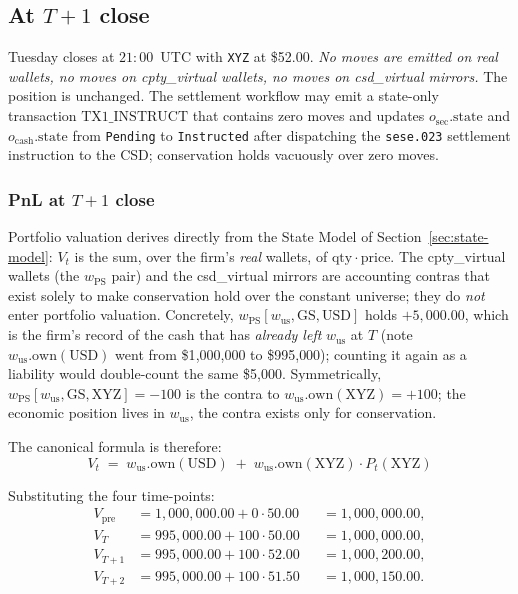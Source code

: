 \documentclass[11pt,a4paper]{article}
\begin{document}
\subsection{At $T+1$ close}
\label{sec:buy-T1}

Tuesday closes at $21{:}00$~UTC with \texttt{XYZ} at \$52.00. \emph{No moves are emitted on real wallets, no moves on cpty\_virtual wallets, no moves on csd\_virtual mirrors.} The position is unchanged. The settlement workflow may emit a state-only transaction $\mathrm{TX1\_INSTRUCT}$ that contains zero moves and updates $o_{\mathrm{sec}}.\mathrm{state}$ and $o_{\mathrm{cash}}.\mathrm{state}$ from \texttt{Pending} to \texttt{Instructed} after dispatching the \texttt{sese.023} settlement instruction to the CSD; conservation holds vacuously over zero moves.

\subsubsection*{PnL at $T+1$ close}

Portfolio valuation derives directly from the State Model of Section~\ref{sec:state-model}: $V_t$ is the sum, over the firm's \emph{real} wallets, of $\mathrm{qty} \cdot \mathrm{price}$. The cpty\_virtual wallets (the $w_{\mathrm{PS}}$ pair) and the csd\_virtual mirrors are accounting contras that exist solely to make conservation hold over the constant universe; they do \emph{not} enter portfolio valuation. Concretely, $w_{\mathrm{PS}}[w_{\mathrm{us}}, \mathrm{GS}, \mathrm{USD}]$ holds $+5{,}000.00$, which is the firm's record of the cash that has \emph{already left} $w_{\mathrm{us}}$ at $T$ (note $w_{\mathrm{us}}.\mathrm{own}(\mathrm{USD})$ went from \$1{,}000{,}000 to \$995{,}000); counting it again as a liability would double-count the same \$5{,}000. Symmetrically, $w_{\mathrm{PS}}[w_{\mathrm{us}}, \mathrm{GS}, \mathrm{XYZ}] = -100$ is the contra to $w_{\mathrm{us}}.\mathrm{own}(\mathrm{XYZ}) = +100$; the economic position lives in $w_{\mathrm{us}}$, the contra exists only for conservation.

The canonical formula is therefore:
\[
\boxed{\;V_t \;=\; w_{\mathrm{us}}.\mathrm{own}(\mathrm{USD}) \;+\; w_{\mathrm{us}}.\mathrm{own}(\mathrm{XYZ}) \cdot P_t(\mathrm{XYZ})\;}
\]

Substituting the four time-points:
\begin{align*}
V_{\mathrm{pre}} &= 1{,}000{,}000.00 + 0 \cdot 50.00            &&= 1{,}000{,}000.00, \\
V_T              &= 995{,}000.00   + 100 \cdot 50.00            &&= 1{,}000{,}000.00, \\
V_{T+1}          &= 995{,}000.00   + 100 \cdot 52.00            &&= 1{,}000{,}200.00, \\
V_{T+2}          &= 995{,}000.00   + 100 \cdot 51.50            &&= 1{,}000{,}150.00.
\end{align*}
\end{document}
